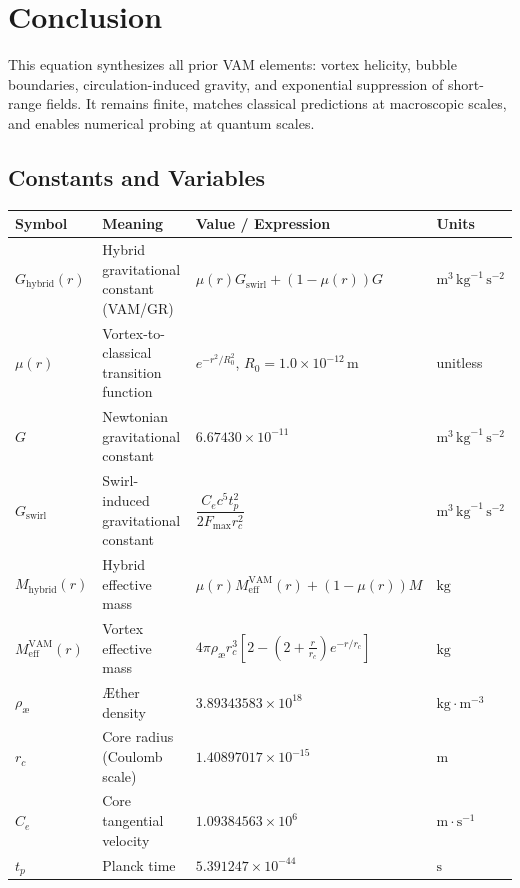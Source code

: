 \section*{Conclusion}
This equation synthesizes all prior VAM elements: vortex helicity, bubble boundaries, circulation-induced gravity, and exponential suppression of short-range fields. It remains finite, matches classical predictions at macroscopic scales, and enables numerical probing at quantum scales.

\subsection{Constants and Variables}

\begin{table}[h]
      \centering
      \begin{tabular}{llll}
          \toprule
          \textbf{Symbol} & \textbf{Meaning} & \textbf{Value / Expression} & \textbf{Units} \\
          \midrule
        $G_{\text{hybrid}}(r)$ & Hybrid gravitational constant (VAM/GR) & $\mu(r) G_{\text{swirl}} + (1 - \mu(r)) G$ & $\text{m}^3\,\text{kg}^{-1}\,\text{s}^{-2}$ \\
        $\mu(r)$ & Vortex-to-classical transition function & $e^{-r^2 / R_0^2}$, $R_0 = 1.0 \times 10^{-12}\,\text{m}$ & unitless \\
        $G$ & Newtonian gravitational constant & $6.67430 \times 10^{-11}$ & $\text{m}^3\,\text{kg}^{-1}\,\text{s}^{-2}$ \\
        $G_{\text{swirl}}$ & Swirl-induced gravitational constant & $\dfrac{C_e c^5 t_p^2}{2 F_{\max} r_c^2}$ & $\text{m}^3\,\text{kg}^{-1}\,\text{s}^{-2}$ \\
        $M_{\text{hybrid}}(r)$ & Hybrid effective mass & $\mu(r) M_\text{eff}^\text{VAM}(r) + (1 - \mu(r)) M$ & $\text{kg}$ \\
        $M_\text{eff}^\text{VAM}(r)$ & Vortex effective mass & $4\pi \rho_\text{\ae} r_c^3 \left[ 2 - (2 + \frac{r}{r_c}) e^{-r/r_c} \right]$ & $\text{kg}$ \\
        $\rho_\text{\ae}$ & Æther density & $3.89343583 \times 10^{18}$ & $\text{kg}\cdot\text{m}^{-3}$ \\
        $r_c$ & Core radius (Coulomb scale) & $1.40897017 \times 10^{-15}$ & $\text{m}$ \\
        $C_e$ & Core tangential velocity & $1.09384563 \times 10^{6}$ & $\text{m}\cdot\text{s}^{-1}$ \\
        $t_p$ & Planck time & $5.391247 \times 10^{-44}$ & $\text{s}$ \\

\end{tabular}
\end{table}

